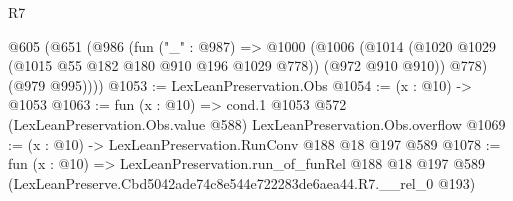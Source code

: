 \begin{lexlean}{R7}
\begin{coremodule}
  @605
    (@651
      (@986
        (fun ("_" : @987) =>
        @1000
          (@1006
            (@1014 (@1020 @1029 (@1015 @55 @182 @180 @910 @196 @1029 @778)) (@972 @910 @910))
            @778)
          (@979 @995))))
@1053 := LexLeanPreservation.Obs
@1054 := (x : @10) -> @1053
@1063 := fun (x : @10) =>
  cond.{1} @1053 @572 (LexLeanPreservation.Obs.value @588) LexLeanPreservation.Obs.overflow
@1069 := (x : @10) -> LexLeanPreservation.RunConv @188 @18 @197 @589
@1078 := fun (x : @10) =>
  LexLeanPreservation.run_of_funRel
    @188
    @18
    @197
    @589
    (LexLeanPreserve.Cbd5042ade74c8e544e722283de6aea44.R7.__rel_0 @193)
\end{coremodule}
\end{lexlean}
